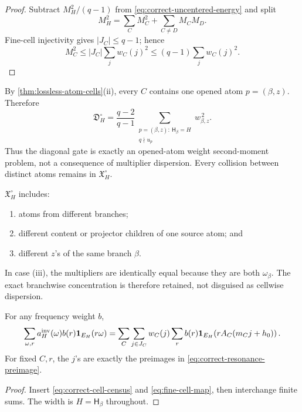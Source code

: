 \begin{proof}
Subtract \(M_H^2/(q-1)\) from
\eqref{eq:correct-uncentered-energy} and split
\[
 M_H^2=\sum_CM_C^2+\sum_{C\ne D}M_CM_D.
\]
Fine-cell injectivity gives \(|J_C|\le q-1\); hence
\[
 M_C^2
 \le |J_C|\sum_jw_C(j)^2
 \le(q-1)\sum_jw_C(j)^2.
\]
\end{proof}

\begin{remark}
\label{rem:singleton-diagonal}
By \cref{thm:lossless-atom-cells}(ii), every \(C\) contains one
opened atom \(p=(\beta,z)\).  Therefore
\begin{equation}
 \mathfrak D_H^\circ
 =
 \frac{q-2}{q-1}
 \sum_{\substack{p=(\beta,z):\ \mathsf H_\beta=H\\q\nmid u_p}}
 w_{\beta,z}^{\,2}.
\label{eq:singleton-diagonal}
\end{equation}
Thus the diagonal gate is exactly an opened-atom weight
second-moment problem, not a consequence of multiplier dispersion.
Every collision between distinct atoms remains in
\(\mathfrak X_H^\circ\).
\end{remark}

\begin{remark}
\(\mathfrak X_H^\circ\) includes:
\begin{enumerate}[label=(\roman*),leftmargin=2.2em]
\item atoms from different branches;
\item different content or projector children of one source atom;
  and
\item different \(z\)'s of the same branch \(\beta\).
\end{enumerate}
In case (iii), the multipliers are identically equal because they
are both \(\omega_\beta\).  The exact branchwise concentration is
therefore retained, not disguised as cellwise dispersion.
\end{remark}

\begin{proposition}
\label{prop:correct-cell-carrier}
For any frequency weight \(b\),
\begin{align}
 \sum_{\omega,r}a_H^{\rm inv}(\omega)b(r)
 \mathbf 1_{E_H}(r\omega)
 =
 \sum_{C}\sum_{j\in J_C}w_C(j)
 \sum_rb(r)
 \mathbf 1_{E_H}\!\left(rA_C(m_Cj+h_0)\right).
\label{eq:correct-cell-carrier}
\end{align}
For fixed \(C,r\), the \(j\)'s are exactly the preimages in
\eqref{eq:correct-resonance-preimage}.
\end{proposition}

\begin{proof}
Insert \eqref{eq:correct-cell-census} and
\eqref{eq:fine-cell-map}, then interchange finite sums.  The width
is \(H=\mathsf H_\beta\) throughout.
\end{proof}
